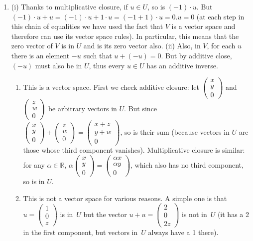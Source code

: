 \begin{enumerate}
 \item 
 (i) Thanks to multiplicative closure, if $u\in U$, so is $(-1)\cdot u$. But $(-1) \cdot u + u = (-1)\cdot u + 1\cdot u
 = (-1+1)\cdot u= 0.u = 0$ (at each step in this chain of equalities we have used the fact that $V$ is a vector space
 and therefore can use its vector space rules). In particular, this means that the zero vector of $V$ is in $U$ and  is its
 zero vector also.  (ii) Also, in $V$, for each $u$ there is an element $-u$ such that $u+(-u)=0$. But by additive 
 close, $(-u)$ must also be in $U$, thus every $u\in U$ has an additive inverse.
 
 
 \begin{enumerate}
 \item This is a vector space. First we check additive closure: let $\begin{pmatrix}x \\ y\\0\end{pmatrix}$ and $\begin{pmatrix}z \\ w\\0\end{pmatrix}$
 be arbitrary vectors in $U$. But since $\begin{pmatrix}x \\ y\\0\end{pmatrix} + \begin{pmatrix}z \\ w\\0\end{pmatrix}
 = \begin{pmatrix}x+z \\ y+w\\0\end{pmatrix}$, so is their sum (because vectors in $U$ are those whose third component vanishes).  Multiplicative closure is similar: for any $\alpha\in {\mathbb R}$, $\alpha \begin{pmatrix}x \\ y\\0\end{pmatrix}= \begin{pmatrix}\alpha x \\ \alpha y\\0\end{pmatrix}$, which also has no third component, so is in $U$.
 
 \item This is not a vector space for various reasons. A simple one is that $u=\begin{pmatrix}1\\0\\z\end{pmatrix}$
 is in~$U$ but the vector $u+u=\begin{pmatrix}2\\0\\2z\end{pmatrix}$ is not in~$U$ (it has a 2 in the first component, 
 but vectors in~$U$ always have a 1 there).
 \end{enumerate}
 


\end{enumerate}
